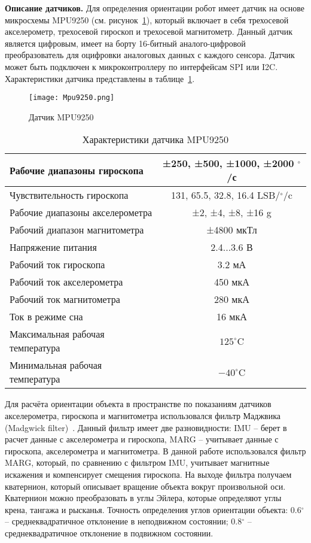 \textbf{Описание датчиков.} Для определения ориентации робот имеет датчик на основе микросхемы MPU9250 (см. рисунок~\ref{Mpu9250}), который включает в себя трехосевой акселерометр, трехосевой гироскоп и трехосевой магнитометр. Данный датчик является цифровым, имеет на борту 16-битный аналого-цифровой преобразователь для оцифровки аналоговых данных с каждого сенсора. Датчик может быть подключен к микроконтроллеру по интерфейсам SPI или I2C. Характеристики датчика представлены в таблице~\ref{tabMpu}.

\begin{figure}[h]
	\centering
	\texttt{[image: Mpu9250.png]}%
	\caption{Датчик MPU9250}
	\label{Mpu9250}
\end{figure}

\begin{table}[h]
	\centering
	\caption{Характеристики датчика MPU9250}\label{tabMpu}
	\begin{tabular}{|l|c|}
		\hline
		Рабочие диапазоны гироскопа & ±250, ±500, ±1000, ±2000 $^\circ$/с \\ \hline
		Чувствительность гироскопа & 131, 65.5, 32.8, 16.4 LSB/$^\circ$/c \\ \hline
		Рабочие диапазоны акселерометра & ±2, ±4, ±8, ±16 g\\ \hline
		Рабочий диапазон магнитометра & ±4800 мкТл\\ \hline
		Напряжение питания & 2.4...3.6 В\\ \hline
		Рабочий ток гироскопа & 3.2 мА\\ \hline
		Рабочий ток акселерометра & 450 мкА\\ \hline
		Рабочий ток магнитометра & 280 мкА\\ \hline
		Ток в режиме сна & 16 мкА \\ \hline
		Максимальная рабочая температура	&	$125^\circ$C 	\\ \hline
		Минимальная рабочая температура 	&	$-40^\circ$C \\ \hline
	\end{tabular}
\end{table}

Для расчёта ориентации объекта в пространстве по показаниям датчиков акселерометра, гироскопа и магнитометра использовался фильтр Маджвика (Madgwick filter)~\cite{Madgwick}. Данный фильтр имеет две разновидности: IMU -- берет в  расчет данные с акселерометра и гироскопа, MARG -- учитывает данные с гироскопа, акселерометра и магнитометра. В данной работе использовался фильтр MARG, который, по сравнению с фильтром IMU, учитывает магнитные искажения и компенсирует смещения гироскопа. На выходе фильтра получаем кватернион, который описывает вращение объекта вокруг произвольной оси. Кватернион можно преобразовать в углы Эйлера, которые определяют углы крена, тангажа и рысканья. Точность определения углов ориентации объекта: 0.6$^\circ$ -- среднеквадратичное отклонение в неподвижном состоянии; 0.8$^\circ$ -- среднеквадратичное отклонение в подвижном состоянии.

